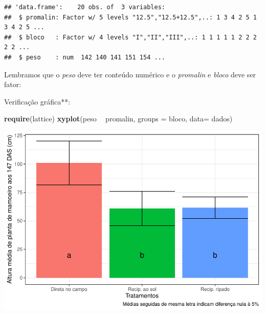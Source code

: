 \documentclass[
]{book}
\newenvironment{Shaded}{\begin{snugshade}}{\end{snugshade}}
\newcommand{\DataTypeTok}[1]{\textcolor[rgb]{0.13,0.29,0.53}{#1}}
\newcommand{\KeywordTok}[1]{\textcolor[rgb]{0.13,0.29,0.53}{\textbf{#1}}}
\newcommand{\NormalTok}[1]{#1}
\newcommand{\OperatorTok}[1]{\textcolor[rgb]{0.81,0.36,0.00}{\textbf{#1}}}
\newcommand{\StringTok}[1]{\textcolor[rgb]{0.31,0.60,0.02}{#1}}
\begin{document}
\begin{verbatim}
## 'data.frame':    20 obs. of  3 variables:
##  $ promalin: Factor w/ 5 levels "12.5","12.5+12.5",..: 1 3 4 2 5 1 3 4 2 5 ...
##  $ bloco   : Factor w/ 4 levels "I","II","III",..: 1 1 1 1 1 2 2 2 2 2 ...
##  $ peso    : num  142 140 141 151 154 ...
\end{verbatim}

Lembramos que o \emph{peso} deve ter conteúdo numérico e o \emph{promalin} e \emph{bloco} deve ser fator:

\begin{Shaded}
\end{Shaded}

Verificação gráfica**:

\begin{Shaded}
\begin{Highlighting}[]
\KeywordTok{require}\NormalTok{(lattice)}
\KeywordTok{xyplot}\NormalTok{(peso }\OperatorTok{~}\StringTok{ }\NormalTok{promalin, }
        \DataTypeTok{groups =}\NormalTok{ bloco, }
        \DataTypeTok{data=}\NormalTok{ dados)}
\end{Highlighting}
\end{Shaded}

\includegraphics{TudodoR_files/figure-latex/unnamed-chunk-320-1.pdf}
\end{document}
